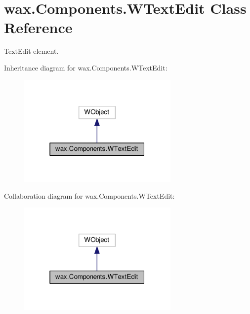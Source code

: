 \hypertarget{classwax_1_1Components_1_1WTextEdit}{}\section{wax.\+Components.\+W\+Text\+Edit Class Reference}
\label{classwax_1_1Components_1_1WTextEdit}


Text\+Edit element.  




Inheritance diagram for wax.\+Components.\+W\+Text\+Edit\+:\nopagebreak
\begin{figure}[H]
\begin{center}
\leavevmode
\includegraphics[width=223pt]{classwax_1_1Components_1_1WTextEdit__inherit__graph}
\end{center}
\end{figure}


Collaboration diagram for wax.\+Components.\+W\+Text\+Edit\+:\nopagebreak
\begin{figure}[H]
\begin{center}
\leavevmode
\includegraphics[width=223pt]{classwax_1_1Components_1_1WTextEdit__coll__graph}
\end{center}
\end{figure}

